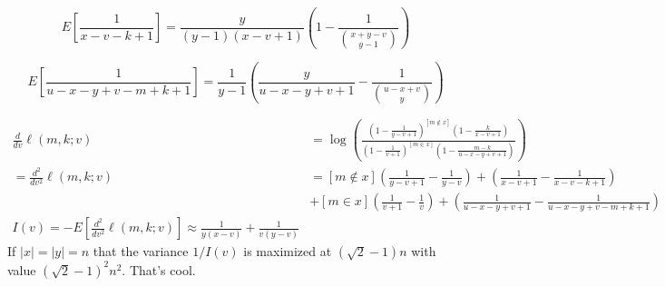 \[
   E\left[\frac{1}{x-v-k+1}\right] = \frac{y}{(y-1)(x-v+1)}\left(1-\frac{1}{\binom{x+y-v}{y-1}}\right)
\]

\[
   E\left[\frac{1}{u-x-y+v-m+k+1}\right] = \frac1{y-1}
\left(\frac{y}{u-x-y+v+1}-\frac1{\binom{u-x+v}{y}}\right)
\]


\begin{align}
   \frac{d}{dv}\ell(m,k;v)&=
   \log\left(\frac{(1-\frac1{y-v+1})^{[m\not\in x]}(1-\frac{k}{x-v+1})}{(1-\frac 1{v+1})^{[m\in x]}(1-\frac{m-k}{u-x-y+v+1})}\right)
   \\
   = \frac{d^2}{dv^2}\ell(m,k;v)&=
    [m\not\in x](\frac1{y-v+1}-\frac1{y-v})
   + (\frac1{x-v+1}-\frac1{x-v-k+1})
                            \\&
                            +[m\in x](\frac1{v+1}-\frac1{v})
   + (\frac1{u-x-y+v+1}-\frac1{u-x-y+v-m+k+1})
   \\
   I(v) = -E[\frac{d^2}{dv^2}\ell(m,k;v)]
   \approx \frac{1}{y(x-v)} + \frac1{v(y-v)}
\end{align}
If $|x|=|y|=n$ that the variance $1/I(v)$ is maximized at $(\sqrt{2}-1)n$ with value $(\sqrt2-1)^2n^2$.
That's cool.

